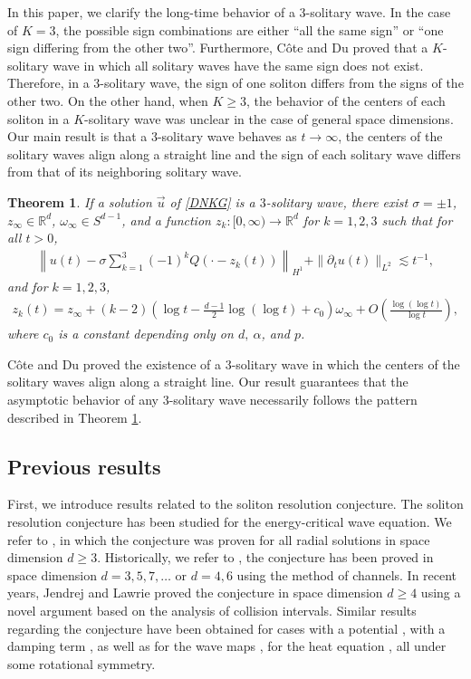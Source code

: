 \documentclass[reqno]{amsart}
\theoremstyle{plain}
\newtheorem{theorem}{Theorem}[section]
\theoremstyle{definition}
\numberwithin{equation}{section}
\newcommand{\1}{\mathbbm{1}}
\begin{document}
In this paper, we clarify the long-time behavior of a $3$-solitary wave. In the case of $K=3$, the possible sign combinations are either ``all the same sign'' or ``one sign differing from the other two''. Furthermore, C\^{o}te and Du \cite{CD} proved that a $K$-solitary wave in which all solitary waves have the same sign does not exist. Therefore, in a $3$-solitary wave, the sign of one soliton differs from the signs of the other two. On the other hand, when $K\geq 3$, the behavior of the centers of each soliton in a $K$-solitary wave was unclear in the case of general space dimensions. Our main result is that a $3$-solitary wave behaves as $t\to\infty$, the centers of the solitary waves align along a straight line and the sign of each solitary wave differs from that of its neighboring solitary wave. 
\begin{theorem}\label{maintheorem}
If a solution $\vec{u}$ of \eqref{DNKG} is a $3$-solitary wave, there exist $\sigma=\pm 1$, $z_{\infty}\in \mathbb{R}^d$, $\omega_{\infty}\in S^{d-1}$, and a function $z_k:[0,\infty)\to \mathbb{R}^d$ for $k=1,2,3$ such that for all $t>0$,
\begin{align}\label{3soli}
\left\| u(t)-\sigma \sum_{k=1}^3 (-1)^k Q(\cdot-z_k(t))\right\|_{H^1}+\|{\partial}_tu(t)\|_{L^2}\lesssim t^{-1},
\end{align}
and for $k=1,2,3$,
\begin{align}\label{zes}
z_k(t)=z_{\infty}+(k-2)\left( \log{t}-\frac{d-1}{2}\log{(\log{t})}+c_0\right)\omega_{\infty}+O\left(\frac{\log{(\log{t})}}{\log{t}}\right),
\end{align}
where $c_0$ is a constant depending only on $d,\ \alpha$, and $p$.
\end{theorem}
C\^{o}te and Du \cite{CD} proved the existence of a 3-solitary wave in which the centers of the solitary waves align along a straight line. Our result guarantees that the asymptotic behavior of any 3-solitary wave necessarily follows the pattern described in Theorem \ref{maintheorem}.





\subsection{Previous results}

First, we introduce results related to the soliton resolution conjecture. The soliton resolution conjecture has been studied for the energy-critical wave equation. We refer to \cite{DKM1,JL4}, in which the conjecture was proven for all radial solutions in space dimension $d\geq 3$. Historically, we refer to \cite{CDKM, DJKM, DKM1, DKM2}, the conjecture has been proved in space dimension $d=3,5,7,\ldots$ or $d=4,6$ using the method of channels. In recent years, Jendrej and Lawrie \cite{JL4} proved the conjecture in space dimension $d\geq 4$ using a novel argument based on the analysis of collision intervals. Similar results regarding the conjecture have been obtained for cases with a potential \cite{JLX,LMZ}, with a damping term \cite{GZ}, as well as for the wave maps \cite{DKMM,JL1}, for the heat equation \cite{A1}, all under some rotational symmetry.
\end{document}
